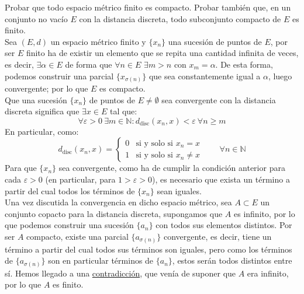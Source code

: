 \begin{ejercicio}
Probar que todo espacio métrico finito es compacto. Probar también que, en un conjunto no vacío \( E \) con la distancia discreta, todo subconjunto compacto de \( E \) es finito.\\

\noindent
Sea $(E,d)$ un espacio métrico finito y $\{x_n\}$ una sucesión de puntos de $E$, por ser $E$ finito ha de existir un elemento que se repita una cantidad infinita de veces, es decir, $\exists \alpha\in E$ de forma que $\forall n\in E$ $\exists m>n$ con $x_m = \alpha$. De esta forma, podemos construir una parcial $\{x_{\sigma(n)}\}$ que sea constantemente igual a $\alpha$, luego convergente; por lo que $E$ es compacto.\\

\noindent
Que una sucesión $\{x_n\}$ de puntos de $E\neq \emptyset $ sea convergente con la distancia discreta significa que $\exists x\in E$ tal que:
\begin{equation*}
    \forall \varepsilon>0~\exists m\in \mathbb{N} : d_{\text{disc}}(x_n,x) < \varepsilon~\forall n\geq m
\end{equation*}
En particular, como:
\begin{equation*}
    d_{\text{disc}}(x_n, x) = \left\{\begin{array}{ll}
            0 & \text{si y solo si\ } x_n = x \\
            1 & \text{si y solo si\ } x_n \neq x 
    \end{array}\right. \qquad \forall n\in \mathbb{N}
\end{equation*}
Para que $\{x_n\}$ sea convergente, como ha de cumplir la condición anterior para cada $\varepsilon >0$ (en particular, para $1>\varepsilon>0$), es necesario que exista un término a partir del cual todos los términos de $\{x_n\}$ sean iguales.\\

\noindent
Una vez discutida la convergencia en dicho espacio métrico, sea $A\subset E$ un conjunto copacto para la distancia discreta, supongamos que $A$ es infinito, por lo que podemos construir una sucesión $\{a_n\}$ con todos sus elementos distintos. Por ser $A$ compacto, existe una parcial $\{a_{\sigma(n)}\}$ convergente, es decir, tiene un término a partir del cual todos sus términos son iguales, pero como los términos de $\{a_{\sigma(n)}\}$ son en particular términos de $\{a_n\}$, estos serán todos distintos entre sí. Hemos llegado a una \underline{contradicción}, que venía de suponer que $A$ era infinito, por lo que $A$ es finito.
\end{ejercicio}

